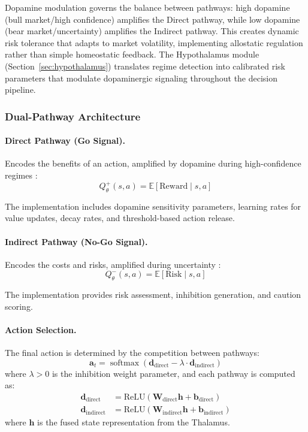 \documentclass[12pt, a4paper]{article}
\DeclareMathOperator{\softmax}{softmax}
\begin{document}
Dopamine modulation governs the balance between pathways: high dopamine (bull market/high confidence) amplifies the Direct pathway, while low dopamine (bear market/uncertainty) amplifies the Indirect pathway.
This creates dynamic risk tolerance that adapts to market volatility, implementing allostatic regulation \citep{sterling2012allostasis} rather than simple homeostatic feedback.
The Hypothalamus module (Section~\ref{sec:hypothalamus}) translates regime detection into calibrated risk parameters that modulate dopaminergic signaling throughout the decision pipeline.

\subsubsection{Dual-Pathway Architecture}

\paragraph{Direct Pathway (Go Signal).}
Encodes the benefits of an action, amplified by dopamine during high-confidence regimes \citep{schultz1997reward}:
\begin{equation}
	Q^+_\theta(s, a) = \mathbb{E}[\text{Reward} \mid s, a]
	\label{eq:go_signal}
\end{equation}

The implementation includes dopamine sensitivity parameters, learning rates for value updates, decay rates, and threshold-based action release.

\paragraph{Indirect Pathway (No-Go Signal).}
Encodes the costs and risks, amplified during uncertainty \citep{collins2014opponent}:
\begin{equation}
	Q^-_\theta(s, a) = \mathbb{E}[\text{Risk} \mid s, a]
	\label{eq:nogo_signal}
\end{equation}

The implementation provides risk assessment, inhibition generation, and caution scoring.

\paragraph{Action Selection.}
The final action is determined by the competition between pathways:
\begin{equation}
	\mathbf{a}_t = \softmax(\mathbf{d}_{\text{direct}} - \lambda \cdot \mathbf{d}_{\text{indirect}})
	\label{eq:action_selection}
\end{equation}
where $\lambda > 0$ is the inhibition weight parameter, and each pathway is computed as:
\begin{align}
	\mathbf{d}_{\text{direct}}   & = \text{ReLU}(\mathbf{W}_{\text{direct}} \mathbf{h} + \mathbf{b}_{\text{direct}})     \label{eq:d_direct} \\
	\mathbf{d}_{\text{indirect}} & = \text{ReLU}(\mathbf{W}_{\text{indirect}} \mathbf{h} + \mathbf{b}_{\text{indirect}})  \label{eq:d_indirect}
\end{align}
where $\mathbf{h}$ is the fused state representation from the Thalamus.
\end{document}
